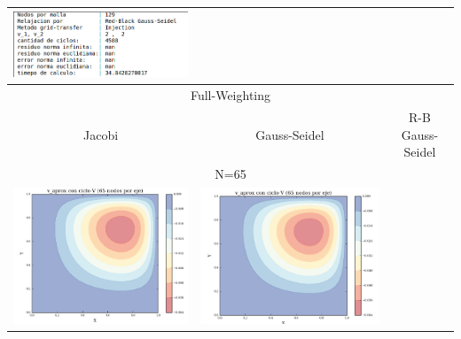 \documentclass[letter,10pt]{article}
\begin{document}
\begin{table}[H]
\begin{tabular}[t]{|c|c|c|}
\includegraphics[scale=0.40]{img/v_cvRBGS129Ninjection} \\ \hline
\multicolumn{3}{|c|}{Full-Weighting} \\ \hline
Jacobi & Gauss-Seidel & R-B Gauss-Seidel \\
\multicolumn{3}{|c|}{N=65} \\ \hline 
\includegraphics[scale=0.34]{img/v_cvjacobi65NFW} &
\includegraphics[scale=0.34]{img/v_cvGS65NFW} &

\end{tabular}
\end{table}
\end{document}
